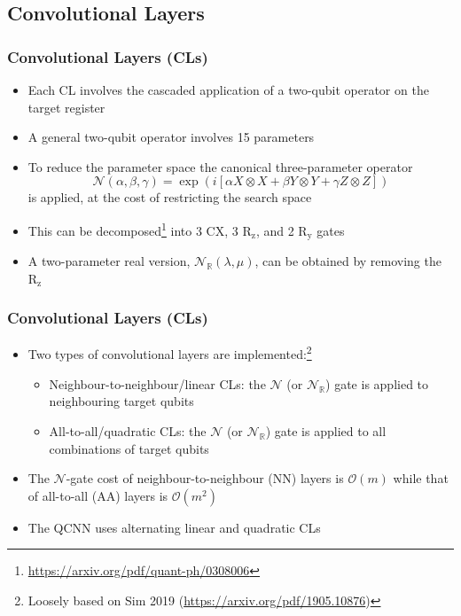\documentclass{beamer}
\begin{document}
\subsection{Convolutional Layers} 
\begin{frame}
\frametitle{Convolutional Layers (CLs)}
\begin{itemize}
\item Each CL involves the cascaded application of a \alert{two-qubit operator} on the target register 
\item A general two-qubit operator involves 15 parameters
\item To reduce the parameter space the canonical \alert{three-parameter operator} 
\begin{equation}
\mathcal{N}(\alpha, \beta, \gamma) = \exp \left( i \left[ \alpha X \otimes X + \beta Y \otimes Y + \gamma Z \otimes Z \right] \right)
\end{equation}
is applied, at the cost of restricting the search space 
\item This can be decomposed\footnote{\url{https://arxiv.org/pdf/quant-ph/0308006}} into 3 CX, 3 $\text{R}_\text{z}$, and 2 $\text{R}_\text{y}$ gates
\item A two-parameter real version, $\mathcal{N}_\mathbb{R}(\lambda, \mu)$, can be obtained by removing the $\text{R}_\text{z}$
\end{itemize}
\end{frame} 

\begin{frame}
\frametitle{Convolutional Layers (CLs)}
\begin{itemize}
\item Two types of convolutional layers are implemented:\footnote{Loosely based on Sim 2019 (\url{https://arxiv.org/pdf/1905.10876})}
\begin{itemize}
\item \alert{Neighbour-to-neighbour/linear CLs}: the $\mathcal{N}$ (or $\mathcal{N}_\mathbb{R}$) gate is applied to neighbouring target qubits 
\item \alert{All-to-all/quadratic CLs}: the $\mathcal{N}$ (or $\mathcal{N}_\mathbb{R}$) gate is applied to all combinations of target qubits
\end{itemize}
\item The $\mathcal{N}$-gate cost of neighbour-to-neighbour (NN) layers is \alert{$\mathcal{O}(m)$} while that of all-to-all (AA) layers is \alert{$\mathcal{O}(m^2)$}
\item The QCNN uses alternating linear and quadratic CLs
\end{itemize}
\end{frame} 
\end{document}
